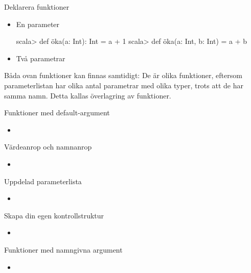 





\begin{Slide}{Deklarera funktioner}
\begin{itemize}
\item En parameter
\begin{REPLnonum}
scala> def öka(a: Int): Int = a + 1
scala> def öka(a: Int, b: Int) = a + b
\end{REPLnonum}
\item Två parametrar
\end{itemize}
Båda ovan funktioner kan finnas samtidigt: De är olika funktioner, eftersom parameterlistan har olika antal parametrar med olika typer, trots att de har samma namn. Detta kallas överlagring  av funktioner.
\end{Slide} 


\begin{Slide}{Funktioner med default-argument}
\begin{itemize}
\item 
\end{itemize}
\end{Slide} 


\begin{Slide}{Värdeanrop och namnanrop}
\begin{itemize}
\item 
\end{itemize}
\end{Slide} 

\begin{Slide}{Uppdelad parameterlista}
\begin{itemize}
\item 
\end{itemize}
\end{Slide} 


\begin{Slide}{Skapa din egen kontrollstruktur}
\begin{itemize}
\item 
\end{itemize}
\end{Slide} 



\begin{Slide}{Funktioner med namngivna argument}
\begin{itemize}
\item 
\end{itemize}
\end{Slide} 


